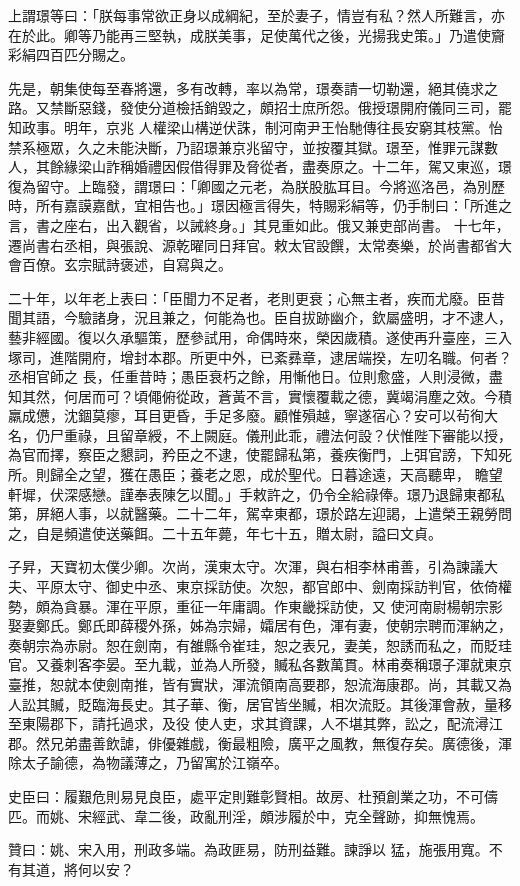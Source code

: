 \begin{pinyinscope}
 上謂璟等曰：「朕每事常欲正身以成綱紀，至於妻子，情豈有私？然人所難言，亦在於此。卿等乃能再三堅執，成朕美事，足使萬代之後，光揚我史策。」乃遣使齎彩絹四百匹分賜之。



 先是，朝集使每至春將還，多有改轉，率以為常，璟奏請一切勒還，絕其僥求之路。又禁斷惡錢，發使分道檢括銷毀之，頗招士庶所怨。俄授璟開府儀同三司，罷知政事。明年，京兆
 人權梁山構逆伏誅，制河南尹王怡馳傳往長安窮其枝黨。怡禁系極眾，久之未能決斷，乃詔璟兼京兆留守，並按覆其獄。璟至，惟罪元謀數人，其餘緣梁山詐稱婚禮因假借得罪及脅從者，盡奏原之。十二年，駕又東巡，璟復為留守。上臨發，謂璟曰：「卿國之元老，為朕股肱耳目。今將巡洛邑，為別歷時，所有嘉謨嘉猷，宜相告也。」璟因極言得失，特賜彩絹等，仍手制曰：「所進之言，書之座右，出入觀省，以誡終身。」其見重如此。俄又兼吏部尚書。
 十七年，遷尚書右丞相，與張說、源乾曜同日拜官。敕太官設饌，太常奏樂，於尚書都省大會百僚。玄宗賦詩褒述，自寫與之。



 二十年，以年老上表曰：「臣聞力不足者，老則更衰；心無主者，疾而尤廢。臣昔聞其語，今驗諸身，況且兼之，何能為也。臣自拔跡幽介，欽屬盛明，才不逮人，藝非經國。復以久承驅策，歷參試用，命偶時來，榮因歲積。遂使再升臺座，三入塚司，進階開府，增封本郡。所更中外，已紊彞章，逮居端揆，左叨名職。何者？丞相官師之
 長，任重昔時；愚臣衰朽之餘，用慚他日。位則愈盛，人則浸微，盡知其然，何居而可？頃僶俯從政，蒼黃不言，實懷覆載之德，冀竭涓塵之效。今積羸成憊，沈錮莫瘳，耳目更昏，手足多廢。顧惟殞越，寧遂宿心？安可以茍徇大名，仍尸重祿，且留章綬，不上闕庭。儀刑此乖，禮法何設？伏惟陛下審能以授，為官而擇，察臣之懇詞，矜臣之不逮，使罷歸私第，養疾衡門，上弭官謗，下知死所。則歸全之望，獲在愚臣；養老之恩，成於聖代。日暮途遠，天高聽卑，
 瞻望軒墀，伏深感戀。謹奉表陳乞以聞。」手敕許之，仍令全給祿俸。璟乃退歸東都私第，屏絕人事，以就醫藥。二十二年，駕幸東都，璟於路左迎謁，上遣榮王親勞問之，自是頻遣使送藥餌。二十五年薨，年七十五，贈太尉，謚曰文貞。



 子昇，天寶初太僕少卿。次尚，漢東太守。次渾，與右相李林甫善，引為諫議大夫、平原太守、御史中丞、東京採訪使。次恕，都官郎中、劍南採訪判官，依倚權勢，頗為貪暴。渾在平原，重征一年庸調。作東畿採訪使，又
 使河南尉楊朝宗影娶妻鄭氏。鄭氏即薛稷外孫，姊為宗婦，孀居有色，渾有妻，使朝宗聘而渾納之，奏朝宗為赤尉。恕在劍南，有雒縣令崔珪，恕之表兄，妻美，恕誘而私之，而貶珪官。又養刺客李晏。至九載，並為人所發，贓私各數萬貫。林甫奏稱璟子渾就東京臺推，恕就本使劍南推，皆有實狀，渾流領南高要郡，恕流海康郡。尚，其載又為人訟其贓，貶臨海長史。其子華、衡，居官皆坐贓，相次流貶。其後渾會赦，量移至東陽郡下，請托過求，及役
 使人吏，求其資課，人不堪其弊，訟之，配流潯江郡。然兄弟盡善飲謔，俳優雜戲，衡最粗險，廣平之風教，無復存矣。廣德後，渾除太子諭德，為物議薄之，乃留寓於江嶺卒。



 史臣曰：履艱危則易見良臣，處平定則難彰賢相。故房、杜預創業之功，不可儔匹。而姚、宋經武、韋二後，政亂刑淫，頗涉履於中，克全聲跡，抑無愧焉。



 贊曰：姚、宋入用，刑政多端。為政匪易，防刑益難。諫諍以
 猛，施張用寬。不有其道，將何以安？



\end{pinyinscope}
